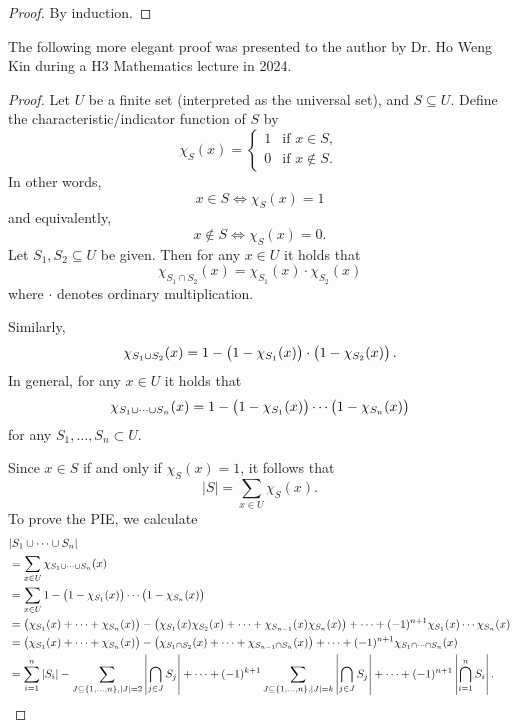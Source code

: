 \begin{proof}
By induction.
\end{proof}

The following more elegant proof was presented to the author by Dr. Ho Weng Kin during a H3 Mathematics lecture in 2024.

\begin{proof}
Let $U$ be a finite set (interpreted as the universal set), and $S\subseteq U$. Define the characteristic/indicator function of $S$ by
\[ \chi_S(x)=\begin{cases}
1&\text{if }x\in S,\\
0&\text{if }x\notin S.
\end{cases} \]
In other words,
\[ x\in S\iff\chi_S(x)=1 \]
and equivalently,
\[ x\notin S\iff\chi_S(x)=0. \]
Let $S_1,S_2\subseteq U$ be given. Then for any $x\in U$ it holds that
\[ \chi_{S_1\cap S_2}(x)=\chi_{S_1}(x)\cdot\chi_{S_2}(x) \]
where $\cdot$ denotes ordinary multiplication.

Similarly,
\[ \chi_{S_1\cup S_2}(x)=1-\left(1-\chi_{S_1}(x)\right)\cdot\left(1-\chi_{S_2}(x)\right). \]
In general, for any $x\in U$ it holds that
\[ \chi_{S_1\cup\cdots\cup S_n}(x)=1-\left(1-\chi_{S_1}(x)\right)\cdots\left(1-\chi_{S_n}(x)\right) \]
for any $S_1,\dots,S_n\subset U$.

Since $x\in S$ if and only if $\chi_S(x)=1$, it follows that
\[ |S|=\sum_{x\in U}\chi_S(x). \]
To prove the PIE, we calculate
\begin{align*}
&|S_1\cup\cdots\cup S_n|\\
&=\sum_{x\in U}\chi_{S_1\cup\cdots\cup S_n}(x)\\
&=\sum_{x\in U}1-\left(1-\chi_{S_1}(x)\right)\cdots\left(1-\chi_{S_n}(x)\right)\\
&=\left(\chi_{S_1}(x)+\cdots+\chi_{S_n}(x)\right)-\left(\chi_{S_1}(x)\chi_{S_2}(x)+\cdots+\chi_{S_{n-1}}(x)\chi_{S_n}(x)\right)+\cdots+(-1)^{n+1}\chi_{S_1}(x)\cdots\chi_{S_n}(x)\\
&=\left(\chi_{S_1}(x)+\cdots+\chi_{S_n}(x)\right)-\left(\chi_{S_1\cap S_2}(x)+\cdots+\chi_{S_{n-1}\cap S_n}(x)\right)+\cdots+(-1)^{n+1}\chi_{S_1\cap\cdots\cap S_n}(x)\\
&=\sum_{i=1}^n|S_i|-\sum_{J\subseteq\{1,\dots,n\},|J|=2}\left|\bigcap_{j\in J}S_j\right|+\cdots+(-1)^{k+1}\sum_{J\subseteq\{1,\dots,n\},|J|=k}\left|\bigcap_{j\in J}S_j\right|+\cdots+(-1)^{n+1}\left|\bigcap_{i=1}^nS_i\right|.
\end{align*}
\end{proof}


